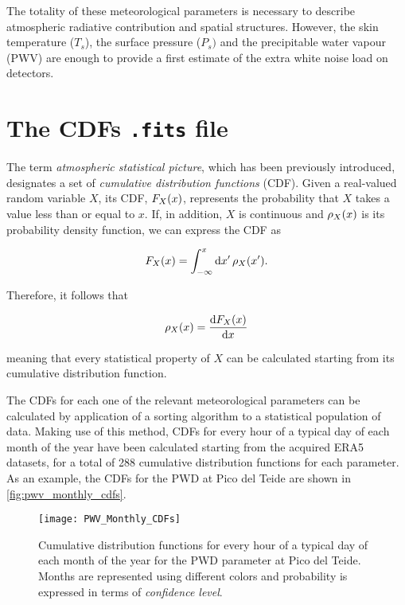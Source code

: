 The totality of these meteorological parameters is necessary to describe
atmospheric radiative contribution and spatial structures. However, the
skin temperature ($T_s$), the surface pressure ($P_s)$ and the precipitable
water vapour (PWV) are enough to provide a first estimate of the extra
white noise load on detectors.

\section{The CDFs \texttt{.fits} file}\label{s:CDF_fits_file}

The term \emph{atmospheric statistical picture}, which has been previously
introduced, designates a set of \emph{cumulative distribution functions} (CDF).
Given a real-valued random variable $X$, its CDF, $F_X\qty(x)$, represents the
probability that $X$ takes a value less than or equal to $x$.
If, in addition, $X$ is continuous and $\rho_X\qty(x)$ is its probability density
function, we can express the CDF as

\begin{equation}
        F_X\qty(x) = \int^x_{-\infty}\dd{x'} \rho_X\qty(x').
\end{equation}

Therefore, it follows that

\begin{equation}
        \rho_X\qty(x) = \dv{F_X\qty(x)}{x}
\end{equation}

meaning that every statistical property of $X$ can be calculated starting
from its cumulative distribution function.

The CDFs for each one of the relevant meteorological parameters can be
calculated by application of a sorting algorithm to a statistical
population of data. Making use of this method, CDFs for every hour of a
typical day of each month of the year have been
calculated starting from the acquired ERA5 datasets, for a total of
\num{288} cumulative distribution functions for each parameter.
As an example, the CDFs for the PWD at Pico del Teide are shown in
\autoref{fig:pwv_monthly_cdfs}.

\begin{figure}
        \centering
        \texttt{[image: PWV\_Monthly\_CDFs]}
        \caption{Cumulative distribution functions for every hour of a
        typical day of each month of the year for the PWD parameter at Pico
        del Teide. Months are represented using different colors and
        probability is expressed in terms of \emph{confidence level}.}
        \label{fig:pwv_monthly_cdfs}
\end{figure}

